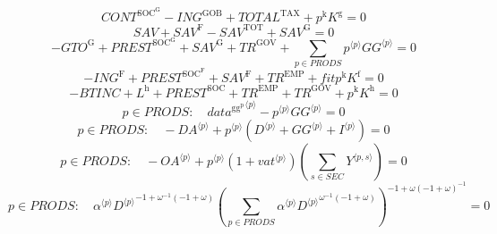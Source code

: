 \begin{equation}
{C\!O\!N\!T}^{\mathrm{SOC}^{\mathrm{G}}} - {I\!N\!G}^{\mathrm{GOB}} + {T\!O\!T\!A\!L}^{\mathrm{TAX}} + {p^{\mathrm{k}}} {K^{\mathrm{g}}} = 0
\end{equation}
\begin{equation}
{S\!A\!V} + {S\!A\!V}^{\mathrm{F}} - {S\!A\!V}^{\mathrm{TOT}} + {S\!A\!V}^{\mathrm{G}} = 0
\end{equation}
\begin{equation}
-{G\!T\!O}^{\mathrm{G}} + {P\!R\!E\!S\!T}^{\mathrm{SOC}^{\mathrm{G}}} + {S\!A\!V}^{\mathrm{G}} + {T\!R}^{\mathrm{GOV}} + \sum_{p\in {P\!R\!O\!D\!S}} {{p}^{\langle p\rangle}} {{{G\!G}}^{\langle p\rangle}} = 0
\end{equation}
\begin{equation}
-{I\!N\!G}^{\mathrm{F}} + {P\!R\!E\!S\!T}^{\mathrm{SOC}^{\mathrm{F}}} + {S\!A\!V}^{\mathrm{F}} + {T\!R}^{\mathrm{EMP}} + {{f\!i\!t}} {p^{\mathrm{k}}} {K^{\mathrm{f}}} = 0
\end{equation}
\begin{equation}
-{B\!T\!I\!N\!C} + L^{\mathrm{h}} + {P\!R\!E\!S\!T}^{\mathrm{SOC}} + {T\!R}^{\mathrm{EMP}} + {T\!R}^{\mathrm{GOV}} + {p^{\mathrm{k}}} {K^{\mathrm{h}}} = 0
\end{equation}
\begin{equation}
p\in {P\!R\!O\!D\!S}\colon\quad {{d\!a\!t\!a}^{\mathrm{gg}^{\mathrm{p}}}}^{\langle p\rangle} - {{p}^{\langle p\rangle}} {{{G\!G}}^{\langle p\rangle}} = 0
\end{equation}
\begin{equation}
p\in {P\!R\!O\!D\!S}\colon\quad -{{D\!A}}^{\langle p\rangle} + {{p}^{\langle p\rangle}} \left({D}^{\langle p\rangle} + {{G\!G}}^{\langle p\rangle} + {I}^{\langle p\rangle}\right) = 0
\end{equation}
\begin{equation}
p\in {P\!R\!O\!D\!S}\colon\quad -{{O\!A}}^{\langle p\rangle} + {{p}^{\langle p\rangle}} \left(1 + {{v\!a\!t}}^{\langle p\rangle}\right) \left(\sum_{s\in {S\!E\!C}} {Y}^{\langle p,s\rangle}\right) = 0
\end{equation}
\begin{equation}
p\in {P\!R\!O\!D\!S}\colon\quad {{\alpha}^{\langle p\rangle}} {{{D}^{\langle p\rangle}}^{-1 + {\omega}^{-1} \left(-1 + \omega\right)}} {\left(\sum_{p\in {P\!R\!O\!D\!S}} {{\alpha}^{\langle p\rangle}} {{{D}^{\langle p\rangle}}^{{\omega}^{-1} \left(-1 + \omega\right)}}\right)^{-1 + {\omega} \left(-1 + \omega\right)^{-1}}} = 0
\end{equation}
